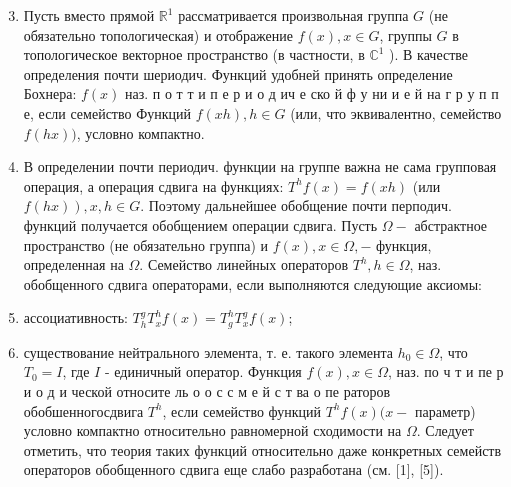 \documentclass[10pt]{article}
\begin{document}
\begin{enumerate}

  \setcounter{enumi}{2}

  \item Пусть вместо прямой $\mathbb{R}^{1}$ рассматривается произвольная группа $G$ (не обязательно топологическая) и отображение $f(x), x \in G$, группы $G$ в топологическое векторное пространство (в частности, в $\mathbb{C}^{1}$ ). В качестве определения почти шериодич. Функций удобней принять определение Бохнера: $f(x)$ наз. п о т т и п е р и о д ич е ско й ф у ни и е й на г р у п п е, если семейство Функций $f(x h), h \in G$ (или, что эквивалентно, семейство $f(h x))$, условно компактно.



  \item В определении почти периодич. функции на группе важна не сама групповая операция, а операция сдвига на функциях: $T^{h} f(x)=f(x h)$ (или $\left.f(h x)\right), x, h \in G$. Поэтому дальнейшее обобщение почти перподич. функций получается обобщением операции сдвига. Пусть $\Omega-$ абстрактное пространство (не обязательно группа) и $f(x), x \in \Omega,-$ функция, определенная на $\Omega$. Семейство линейных операторов $T^{h}, h \in \Omega$, наз. обобщенного сдвига операторами, если выполняются следующие аксиомы:



  \item ассоциативность: $T_{h}^{g} T_{x}^{h} f(x)=T_{g}^{h} T_{x}^{g} f(x)$;



  \item существование нейтрального элемента, т. е. такого элемента $h_{0} \in \Omega$, что $T_{0}=I$, где $I$ - единичный оператор. Функция $f(x), x \in \Omega$, наз. по ч т и пе р и о д и ческой относите ль о о с с м е й с т ва о пе раторов обобшенногосдвига $T^{h}$, если семейство функций $T^{h} f(x)(x-$ параметр) условно компактно относительно равномерной сходимости на $\Omega$. Следует отметить, что теория таких функций относительно даже конкретных семейств операторов обобщенного сдвига еще слабо разработана (см. [1], [5]).




\end{enumerate}
\end{document}
